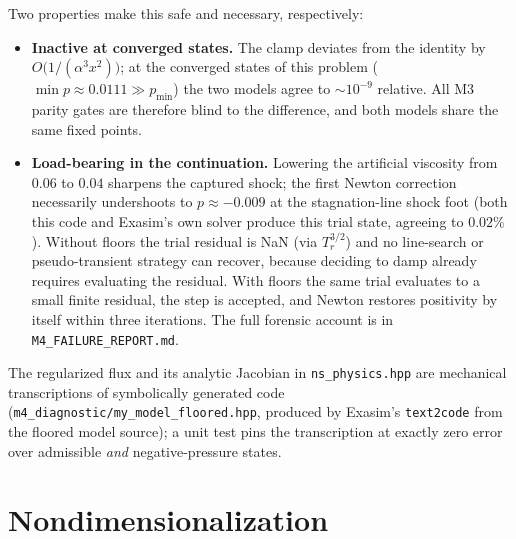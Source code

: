 \documentclass[11pt]{article}
\newcommand{\code}[1]{\texttt{#1}}
\begin{document}
Two properties make this safe and necessary, respectively:
\begin{itemize}
\item \textbf{Inactive at converged states.} The clamp deviates from the
identity by $O\!\bigl(1/(\alpha^3 x^2)\bigr)$; at the converged states of
this problem ($\min p \approx 0.0111 \gg p_{\min}$) the two models agree to
$\sim\!10^{-9}$ relative. All M3 parity gates are therefore blind to the
difference, and both models share the same fixed points.
\item \textbf{Load-bearing in the continuation.} Lowering the artificial
viscosity from $0.06$ to $0.04$ sharpens the captured shock; the first Newton
correction necessarily undershoots to $p \approx -0.009$ at the
stagnation-line shock foot (both this code and Exasim's own solver produce
this trial state, agreeing to $0.02\%$). Without floors the trial residual is
NaN (via $T_r^{3/2}$) and no line-search or pseudo-transient strategy can
recover, because deciding to damp already requires evaluating the residual.
With floors the same trial evaluates to a small finite residual, the step is
accepted, and Newton restores positivity by itself within three iterations.
The full forensic account is in \code{M4\_FAILURE\_REPORT.md}.
\end{itemize}

The regularized flux and its analytic Jacobian in \code{ns\_physics.hpp} are
mechanical transcriptions of symbolically generated code
(\code{m4\_diagnostic/my\_model\_floored.hpp}, produced by Exasim's
\code{text2code} from the floored model source); a unit test pins the
transcription at exactly zero error over admissible \emph{and}
negative-pressure states.

\section{Nondimensionalization}
\label{sec:nondim}
\end{document}
